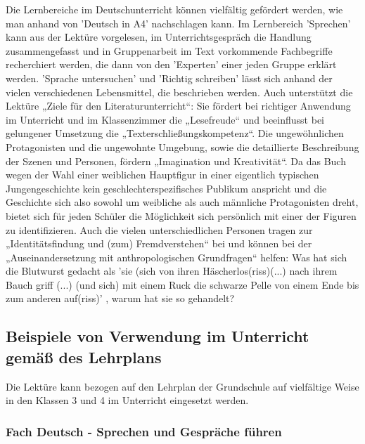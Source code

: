 Die Lernbereiche im Deutschunterricht können vielfältig gefördert werden, wie man anhand von 'Deutsch in A4' \cite[]{DIN} nachschlagen kann. Im Lernbereich 'Sprechen'  kann aus der Lektüre vorgelesen, im Unterrichtsgespräch die Handlung zusammengefasst und in Gruppenarbeit im Text vorkommende Fachbegriffe recherchiert werden, die dann von den 'Experten' einer jeden Gruppe erklärt werden. 'Sprache untersuchen' und 'Richtig schreiben' lässt sich anhand der vielen verschiedenen Lebensmittel, die beschrieben werden. Auch unterstützt die Lektüre „Ziele für den Literaturunterricht“: Sie fördert bei richtiger Anwendung im Unterricht und im Klassenzimmer die „Lesefreude“ und beeinflusst bei gelungener Umsetzung die „Texterschließungskompetenz“. Die ungewöhnlichen Protagonisten und die ungewohnte Umgebung, sowie die detaillierte Beschreibung der Szenen und Personen, fördern „Imagination und Kreativität“. Da das Buch wegen der Wahl einer weiblichen Hauptfigur in einer eigentlich typischen Jungengeschichte kein geschlechterspezifisches Publikum anspricht und die Geschichte sich also sowohl um weibliche als auch männliche Protagonisten dreht, bietet sich für jeden Schüler die Möglichkeit sich persönlich mit einer der Figuren zu identifizieren. Auch die vielen unterschiedlichen Personen tragen zur „Identitätsfindung und (zum) Fremdverstehen“ bei und können bei der „Auseinandersetzung mit anthropologischen Grundfragen“ helfen: Was hat sich die Blutwurst gedacht  als 'sie (sich von ihren Häscherlos(riss)(...) nach ihrem Bauch griff (...) (und sich) mit einem Ruck die schwarze Pelle von einem Ende bis zum anderen auf(riss)' \cite[S.229]{pir},  warum hat sie so gehandelt?



\subsection{Beispiele von Verwendung im Unterricht gemäß des Lehrplans}

Die Lektüre kann bezogen auf den Lehrplan der Grundschule\cite[]{LP}  auf vielfältige Weise in den Klassen 3 und 4 im Unterricht eingesetzt werden. 

\subsubsection{Fach Deutsch - Sprechen und Gespräche führen}

